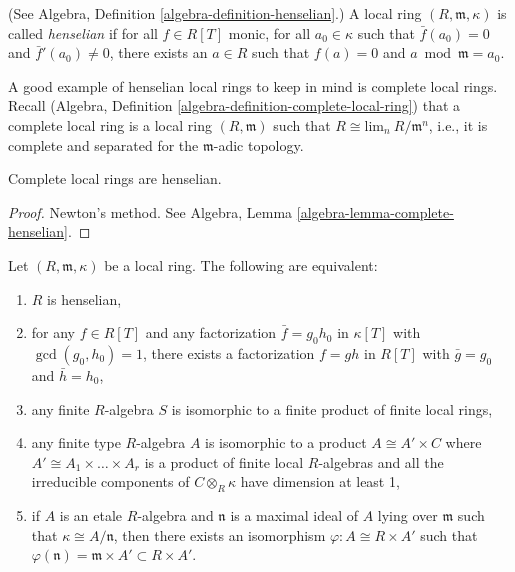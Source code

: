 \begin{definition}
\label{definition-henselian}
(See Algebra, Definition \ref{algebra-definition-henselian}.)
A local ring $(R, \mathfrak m, \kappa)$ is called
{\it henselian} if for all
$f \in R[T]$ monic, for all $a_0 \in \kappa$ such that
$\bar f(a_0) = 0$ and $\bar f'(a_0) \neq 0$, there exists
an $a \in R$ such that $f(a) = 0$ and $a \bmod \mathfrak m = a_0$.
\end{definition}

\noindent
A good example of henselian local rings
to keep in mind is complete local rings.
Recall
(Algebra, Definition \ref{algebra-definition-complete-local-ring})
that a complete local ring is a local ring $(R, \mathfrak m)$ such that
$R \cong \text{lim}_n\ R/\mathfrak m^n$, i.e., it is complete and separated
for the $\mathfrak m$-adic topology.

\begin{theorem}
\label{theorem-hensel}
Complete local rings are henselian.
\end{theorem}

\begin{proof}
Newton's method. See
Algebra, Lemma \ref{algebra-lemma-complete-henselian}.
\end{proof}

\begin{theorem}
\label{theorem-henselian}
Let $(R, \mathfrak m, \kappa)$ be a local ring. The following are equivalent:
\begin{enumerate}
\item $R$ is henselian,
\item for any $f\in R[T]$ and any factorization $\bar f = g_0 h_0$ in
$\kappa[T]$ with $\gcd(g_0,h_0)=1$, there exists a factorization $f=gh$ in
$R[T]$ with $\bar g = g_0$ and $\bar h = h_0$,
\item any finite $R$-algebra $S$ is isomorphic to a finite product of finite
local rings,
\item any finite type $R$-algebra $A$ is isomorphic to a product
$A \cong A' \times C$ where $A' \cong A_1 \times \ldots \times A_r$
is a product of finite local $R$-algebras and all the irreducible
components of $C \otimes_R \kappa$ have dimension at least 1,
\item if $A$ is an etale $R$-algebra and $\mathfrak n$ is a maximal ideal of
$A$ lying over $\mathfrak m$ such that $\kappa \cong A/\mathfrak n$, then there
exists an isomorphism $\varphi: A \cong R \times A'$ such that
$\varphi(\mathfrak n) = \mathfrak m \times A' \subset R \times A'$.
\end{enumerate}
\end{theorem}

